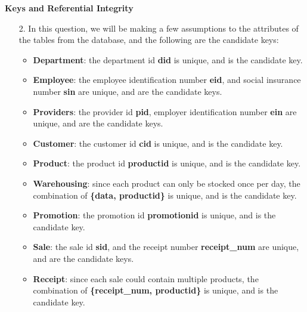 \documentclass[12pt]{article}
\begin{document}
\begin{center}\textbf{Keys and Referential Integrity}\\\end{center}

\begin{enumerate}
\item[2.] In this question, we will be making a few assumptions to the attributes of the tables from the database, and the following are the candidate keys:
    \begin{itemize}
    \item \textbf{Department}: the department id \textbf{did} is unique, and is the candidate key.
    \item \textbf{Employee}: the employee identification number \textbf{eid}, and social insurance number \textbf{sin} are unique, and are the candidate keys.
    \item \textbf{Providers}: the provider id \textbf{pid}, employer identification number \textbf{ein} are unique, and are the candidate keys.
    \item \textbf{Customer}: the customer id \textbf{cid} is unique, and is the candidate key.
    \item \textbf{Product}: the product id \textbf{productid} is unique, and is the candidate key.
    \item \textbf{Warehousing}: since each product can only be stocked once per day, the combination of \textbf{\{data, productid\}} is unique, and is the candidate key.
    \item \textbf{Promotion}: the promotion id \textbf{promotionid} is unique, and is the candidate key.
    \item \textbf{Sale}: the sale id \textbf{sid}, and the receipt number \textbf{receipt\_num} are unique, and are the candidate keys.
    \item \textbf{Receipt}: since each sale could contain multiple products, the combination of \textbf{\{receipt\_num, productid\}} is unique, and is the candidate key.
    \end{itemize}
    


\end{enumerate}
\end{document}
